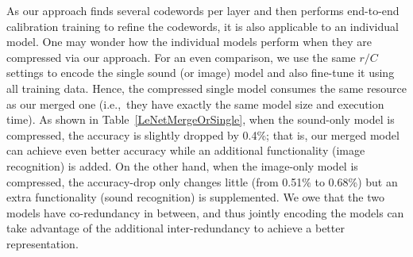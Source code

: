 \documentclass{article}
\begin{document}
	
	
	As our approach finds several codewords per layer and then performs end-to-end calibration training to refine the codewords, it is also applicable to an individual model.
	One may wonder how the individual models perform when they are compressed via our approach.
	For an even comparison, we use the same $r/C$ settings to encode the single sound (or image) model and also fine-tune it using all training data.
	Hence, the compressed single model consumes the same resource as our merged one (i.e.,~they have exactly the same model size and execution time).
	As shown in Table~\ref{LeNetMergeOrSingle}, when the sound-only model is compressed, the accuracy is slightly dropped by 0.4\%; that is, our merged model can achieve even better accuracy while an additional functionality (image recognition) is added.
	On the other hand, when the image-only model is compressed, the accuracy-drop only changes little (from 0.51\% to 0.68\%) but an extra functionality (sound recognition) is supplemented.
	We owe that the two models have co-redundancy in between, and thus jointly encoding the models can take advantage of the additional inter-redundancy to achieve a better representation.
	
\end{document}
